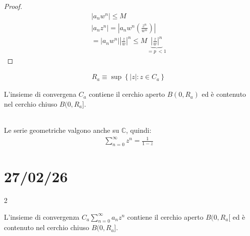 \documentclass[a4paper, oneside]{article}
\begin{document}
    \begin{proof}
        \begin{gather*}
            \left\lvert a_n w^n\right\rvert \leq M\\
            \left\lvert a_n z^n\right\rvert = \left\lvert a_n w^n (\frac{z^n}{w^n})\right\rvert \\
            = \left\lvert a_n w^n \right\rvert \left\lvert \frac{z}{w}\right\rvert^n \leq M \underbrace{\left\lvert \frac{z}{w} \right\rvert^n}_{= p \ <1}
        \end{gather*}
    \end{proof}
    \begin{definition}
        \begin{gather*}
            R_a \equiv \sup \left\{|z|: z \in C_a\right\} 
        \end{gather*}
    \end{definition}
    \begin{theorem}
        L'insieme di convergena $C_a$ contiene il cerchio aperto $B(0, R_a)$ ed è contenuto nel cerchio chiuso $B(0, R_a]$.
    \end{theorem}
    \hfill\\
    Le serie geometriche valgono anche su $\mathbb{C}$, quindi:
    \begin{gather*}
        \sum_{n=0}^{\infty} z^n = \frac{1}{1-z}
    \end{gather*}
    
    \newpage
    \section{27/02/26}
    \begin{multicols}{2}
        \begin{theorem}
            L'insieme di convergenza $C_a \sum_{n=0}^{\infty} a_n z^n$ contiene il cerchio aperto $B(0, R_a[$ 
            ed è contenuto nel cerchio chiuso $B(0, R_a]$.
        \end{theorem}
    \end{multicols}
\end{document}
